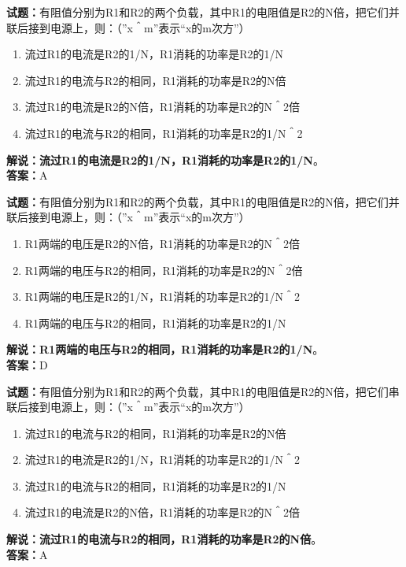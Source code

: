\documentclass{ctexbook}
\begin{document}
\bigskip


\noindent\textbf{试题：}有阻值分别为R1和R2的两个负载，其中R1的电阻值是R2的N倍，把它们并联后接到电源上，则：（”x＾m”表示“x的m次方”）
\begin{enumerate}[leftmargin=3em]
\item 流过R1的电流是R2的1/N，R1消耗的功率是R2的1/N
\item 流过R1的电流与R2的相同，R1消耗的功率是R2的N倍
\item 流过R1的电流是R2的N倍，R1消耗的功率是R2的N＾2倍
\item 流过R1的电流与R2的相同，R1消耗的功率是R2的1/N＾2
\end{enumerate}
\noindent\textbf{解说：}\textbf{流过R1的电流是R2的1/N，R1消耗的功率是R2的1/N}。\\\noindent\textbf{答案：}A




\bigskip


\noindent\textbf{试题：}有阻值分别为R1和R2的两个负载，其中R1的电阻值是R2的N倍，把它们并联后接到电源上，则：（”x＾m”表示“x的m次方”）
\begin{enumerate}[leftmargin=3em]
\item R1两端的电压是R2的N倍，R1消耗的功率是R2的N＾2倍
\item R1两端的电压与R2的相同，R1消耗的功率是R2的N＾2倍
\item R1两端的电压是R2的1/N，R1消耗的功率是R2的1/N＾2
\item R1两端的电压与R2的相同，R1消耗的功率是R2的1/N
\end{enumerate}
\noindent\textbf{解说：}\textbf{R1两端的电压与R2的相同，R1消耗的功率是R2的1/N}。\\\noindent\textbf{答案：}D




\bigskip


\noindent\textbf{试题：}有阻值分别为R1和R2的两个负载，其中R1的电阻值是R2的N倍，把它们串联后接到电源上，则：（”x＾m”表示“x的m次方”）
\begin{enumerate}[leftmargin=3em]
\item 流过R1的电流与R2的相同，R1消耗的功率是R2的N倍
\item 流过R1的电流是R2的1/N，R1消耗的功率是R2的1/N＾2
\item 流过R1的电流与R2的相同，R1消耗的功率是R2的1/N
\item 流过R1的电流是R2的N倍，R1消耗的功率是R2的N＾2倍
\end{enumerate}
\noindent\textbf{解说：}\textbf{流过R1的电流与R2的相同，R1消耗的功率是R2的N倍}。\\\noindent\textbf{答案：}A
\end{document}
